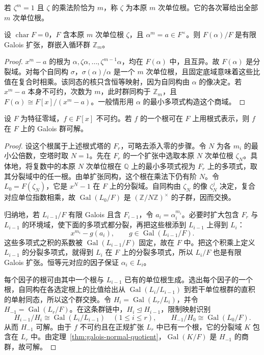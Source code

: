 \documentclass[lang=cn,a4paper,fontset=none,zihao=false,10pt,openany,twoside]{beautybook}
\numberwithin{algorithm}{chapter}
\begin{document}
若 $\zeta^m=1$ 且 $\zeta$ 的乘法阶恰为 $m$，称 $\zeta$ 为本原 $m$ 次单位根。它的各次幂给出全部 $m$ 次单位根。

\begin{proposition}[含单位根时的一步开根]\label{prop:galois-one-radical}
设 $\operatorname{char}F=0$，$F$ 含本原 $m$ 次单位根 $\zeta$，且 $\alpha^m=a\in F^\times$。则 $F(\alpha)/F$ 是有限 Galois 扩张，群嵌入循环群 $\mathbb Z_m$。
\end{proposition}
\begin{proof}
$x^m-a$ 的根为 $\alpha,\zeta\alpha,\ldots,\zeta^{m-1}\alpha$，均在 $F(\alpha)$ 中，且互异。故 $F(\alpha)$ 是分裂域。对每个自同构 $\sigma$，$\sigma(\alpha)/\alpha$ 是一个 $m$ 次单位根，且固定底域意味着这些比值在复合时相乘。该同态的核只含恒等映射，因为自同构由 $\alpha$ 的像决定。若 $x^m-a$ 本身不可约，次数为 $m$，此时群同构于 $\mathbb Z_m$，且 $F(\alpha)\cong F[x]/(x^m-a)$。一般情形用 $\alpha$ 的最小多项式构造这个商域。
\end{proof}

\begin{proposition}\label{prop:radical-necessary}
设 $F$ 为特征零域，$f\in F[x]$ 不可约。若 $f$ 的一个根可在 $F$ 上用根式表示，则 $f$ 在 $F$ 上的 Galois 群可解。
\end{proposition}
\begin{proof}
设这个根属于上述根式塔的 $F_r$，可略去添入零的步骤。令 $N$ 为各 $m_i$ 的最小公倍数，空塔时取 $N=1$。先在 $F_r$ 的一个扩张中选取本原 $N$ 次单位根 $\zeta_N$。具体地，将复数中的本原 $N$ 次单位根在 $\mathbb Q$ 上的最小多项式视为 $F_r$ 上的多项式，取其分裂域中的任一根。由单扩张同构，这个根在乘法下仍有阶 $N$。令 $L_0=F(\zeta_N)$，它是 $x^N-1$ 在 $F$ 上的分裂域。自同构由 $\zeta_N$ 的像 $\zeta_N^j$ 决定，复合对应单位指数相乘，故 $\operatorname{Gal}(L_0/F)$ 是 $(\mathbb Z/N\mathbb Z)^\times$ 的子群，因而交换。

归纳地，若 $L_{i-1}/F$ 有限 Galois 且含 $F_{i-1}$，令 $a_i=\alpha_i^{m_i}$。必要时扩大包含 $F_r$ 与 $L_{i-1}$ 的环境域，使下面的多项式都分裂，再把这些根添到 $L_{i-1}$ 上得到 $L_i$：
\[
 x^{m_i}-g(a_i),\qquad g\in \operatorname{Gal}(L_{i-1}/F).
\]
这些多项式之积的系数被 $\operatorname{Gal}(L_{i-1}/F)$ 固定，故在 $F$ 中。把这个积乘上定义 $L_{i-1}$ 的分裂多项式，就得到 $L_i$ 在 $F$ 上的分裂多项式，所以 $L_i/F$ 也是有限 Galois 扩张。恒等元对应的因子保证 $\alpha_i\in L_i$。

每个因子的根可由其中一个根与 $L_{i-1}$ 已有的单位根生成。选出每个因子的一个根，自同构在各选定根上的比值给出从 $\operatorname{Gal}(L_i/L_{i-1})$ 到若干单位根群的直积的单射同态，所以这个群交换。令 $H_i=\operatorname{Gal}(L_r/L_i)$，并令 $H_{-1}=\operatorname{Gal}(L_r/F)$。在这条群链中，$H_i\trianglelefteq H_{i-1}$，限制映射识别
\[
 H_{i-1}/H_i\cong\operatorname{Gal}(L_i/L_{i-1})\quad(1\le i\le r),
 \qquad H_{-1}/H_0\cong\operatorname{Gal}(L_0/F).
\]
从而 $H_{-1}$ 可解。由于 $f$ 不可约且在正规扩张 $L_r$ 中已有一个根，它的分裂域 $K$ 包含在 $L_r$ 中。由定理~\ref{thm:galois-normal-quotient}，$\operatorname{Gal}(K/F)$ 是 $H_{-1}$ 的商群，故可解。
\end{proof}
\end{document}

